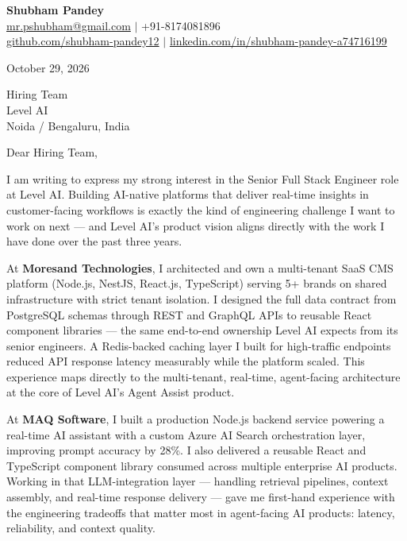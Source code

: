 \documentclass[a4paper,11pt]{article}
\begin{document}
\begin{center}
{\LARGE \textbf{Shubham Pandey}}\\[4pt]
\href{mailto:mr.pshubham@gmail.com}{mr.pshubham@gmail.com} \quad $\vert$ \quad +91-8174081896\\
\href{https://github.com/shubham-pandey12}{github.com/shubham-pandey12} \quad $\vert$ \quad
\href{https://linkedin.com/in/shubham-pandey-a74716199}{linkedin.com/in/shubham-pandey-a74716199}
\end{center}

\vspace{10pt}

\noindent October 29, 2026

\vspace{8pt}

\noindent Hiring Team\\
Level AI\\
Noida / Bengaluru, India

\vspace{14pt}

\noindent Dear Hiring Team,

\vspace{8pt}

\noindent I am writing to express my strong interest in the Senior Full Stack Engineer role at Level AI. Building AI-native platforms that deliver real-time insights in customer-facing workflows is exactly the kind of engineering challenge I want to work on next --- and Level AI's product vision aligns directly with the work I have done over the past three years.

\vspace{8pt}

\noindent At \textbf{Moresand Technologies}, I architected and own a multi-tenant SaaS CMS platform (Node.js, NestJS, React.js, TypeScript) serving 5+ brands on shared infrastructure with strict tenant isolation. I designed the full data contract from PostgreSQL schemas through REST and GraphQL APIs to reusable React component libraries --- the same end-to-end ownership Level AI expects from its senior engineers. A Redis-backed caching layer I built for high-traffic endpoints reduced API response latency measurably while the platform scaled. This experience maps directly to the multi-tenant, real-time, agent-facing architecture at the core of Level AI's Agent Assist product.

\vspace{8pt}

\noindent At \textbf{MAQ Software}, I built a production Node.js backend service powering a real-time AI assistant with a custom Azure AI Search orchestration layer, improving prompt accuracy by 28\%. I also delivered a reusable React and TypeScript component library consumed across multiple enterprise AI products. Working in that LLM-integration layer --- handling retrieval pipelines, context assembly, and real-time response delivery --- gave me first-hand experience with the engineering tradeoffs that matter most in agent-facing AI products: latency, reliability, and context quality.
\end{document}
